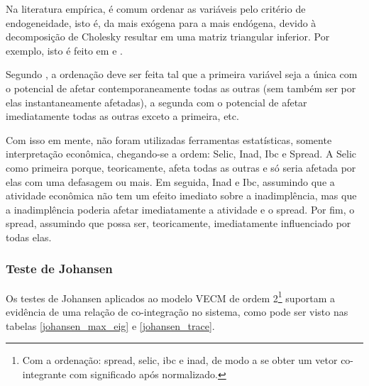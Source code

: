 \documentclass[a4paper,
               article,
               12pt,
               openany,
               oneside,
               english,
               brazil]{abntex2}
\numberwithin{equation}{section}
\begin{document}
    Na literatura empírica, é comum ordenar as variáveis pelo critério de endogeneidade, isto é, da mais exógena para a mais endógena, devido à decomposição de Cholesky resultar em uma matriz triangular inferior. Por exemplo, isto é feito em \textcite{oreiro} e \textcite{chaim}.

    Segundo \textcite[61]{lutkepool}, a ordenação deve ser feita tal que a primeira variável seja a única com o potencial de afetar contemporaneamente todas as outras (sem também ser por elas instantaneamente afetadas), a segunda com o potencial de afetar imediatamente todas as outras exceto a primeira, etc.

    Com isso em mente, não foram utilizadas ferramentas estatísticas, somente interpretação econômica, chegando-se a ordem: Selic, Inad, Ibc e Spread. A Selic como primeira porque, teoricamente, afeta todas as outras e só seria afetada por elas com uma defasagem ou mais. Em seguida, Inad e Ibc, assumindo que a atividade econômica não tem um efeito imediato sobre a inadimplência, mas que a inadimplência poderia afetar imediatamente a atividade e o spread. Por fim, o spread, assumindo que possa ser, teoricamente, imediatamente influenciado por todas elas.

    \subsubsection{Teste de Johansen}

    Os testes de Johansen aplicados ao modelo VECM de ordem 2\footnote{Com a ordenação: spread, selic, ibc e inad, de modo a se obter um vetor co-integrante com significado após normalizado.} suportam a evidência de uma relação de co-integração no sistema, como pode ser visto nas tabelas \autoref{johansen_max_eig} e \autoref{johansen_trace}.
\end{document}
